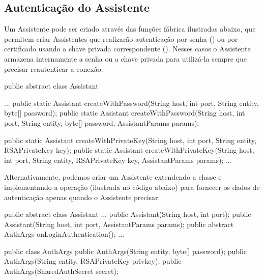 \subsection{Autenticação do Assistente}

Um Assistente pode ser criado através das funções fábrica ilustradas abaixo, que permitem criar Assistentes que realizarão autenticação por senha () ou por certificado usando a chave privada correspondente ().
Nesses casos o Assistente armazena internamente a senha ou a chave privada para utilizá-la sempre que precisar reautenticar a conexão.

\begin{samplecode}
public abstract class Assistant {
  ...
  public static Assistant createWithPassword(String host, int port,
                                             String entity,
                                             byte[] password);
  public static Assistant createWithPassword(String host, int port,
                                             String entity, 
                                             byte[] password,
                                             AssistantParams params);

  public static Assistant createWithPrivateKey(String host, int port,
                                               String entity,
                                               RSAPrivateKey key);
  public static Assistant createWithPrivateKey(String host, int port,
                                               String entity,
                                               RSAPrivateKey key,
                                               AssistantParams params);
  ...
}
\end{samplecode}

Alternativamente, podemos criar um Assistente extendendo a classe  e implementando a operação  (ilustrada no código abaixo) para fornecer os dados de autenticação apenas quando o Assistente precisar.

\begin{samplecode}
public abstract class Assistant {
  ...
  public Assistant(String host, int port);
  public Assistant(String host, int port, AssistantParams params);
  public abstract AuthArgs onLoginAuthentication();
  ...
}

public class AuthArgs {
  public AuthArgs(String entity, byte[] password);
  public AuthArgs(String entity, RSAPrivateKey privkey);
  public AuthArgs(SharedAuthSecret secret);
}
\end{samplecode}

